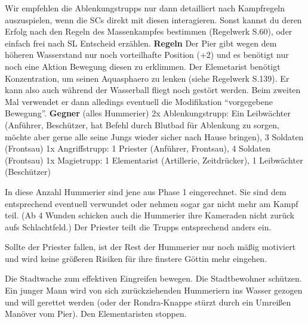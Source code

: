 Wir empfehlen die Ablenkungstrupps nur dann detailliert nach Kampfregeln auszuspielen, wenn die SCs direkt mit diesen interagieren. Sonst kannst du deren Erfolg nach den Regeln des Massenkampfes bestimmen (Regelwerk S.60), oder einfach frei nach SL Entscheid erzählen.
\smallskip
\newline
\textbf{Regeln}
Der Pier gibt wegen dem höheren Wasserstand nur noch vorteilhafte Position (+2) und es benötigt nur noch eine Aktion Bewegung diesen zu erklimmen. \newline
Der Elemetarist benötigt Konzentration, um seinen Aquasphaero zu lenken (siehe Regelwerk S.139). Er kann also auch während der Wasserball fliegt noch gestört werden. Beim zweiten Mal verwendet er dann alledings eventuell die Modifikation \enquote{vorgegebene Bewegung}.
\smallskip 
\newline 
\textbf{Gegner} (alles Hummerier)  \newline
2x Ablenkungstrupp: Ein Leibwächter (Anführer, Beschützer, hat Befehl durch Blutbad für Ablenkung zu sorgen, möchte aber gerne alle seine Jungs wieder sicher nach Hause bringen), 3 Soldaten (Frontsau)
\newline
1x Angriffstrupp: 1 Priester (Anführer, Frontsau), 4 Soldaten (Frontsau)
\newline
1x Magietrupp: 1 Elementarist (Artillerie, Zeitdrücker), 1 Leibwächter (Beschützer)

In diese Anzahl Hummerier sind jene aus Phase 1 eingerechnet. Sie sind dem entsprechend eventuell verwundet oder nehmen sogar gar nicht mehr am Kampf teil. (Ab 4 Wunden schicken auch die Hummerier ihre Kameraden nicht zurück aufs Schlachtfeld.) Der Priester teilt die Trupps entsprechend anders ein.

Sollte der Priester fallen, ist der Rest der Hummerier nur noch mäßig motiviert und wird keine größeren Risiken für ihre finstere Göttin mehr eingehen.

Die Stadtwache zum effektiven Eingreifen bewegen. Die Stadtbewohner schützen. Ein junger Mann wird von sich zurückziehenden Hummeriern ins Wasser gezogen und will gerettet werden (oder der Rondra-Knappe stürzt durch ein Umreißen Manöver vom Pier). Den Elementaristen stoppen.


